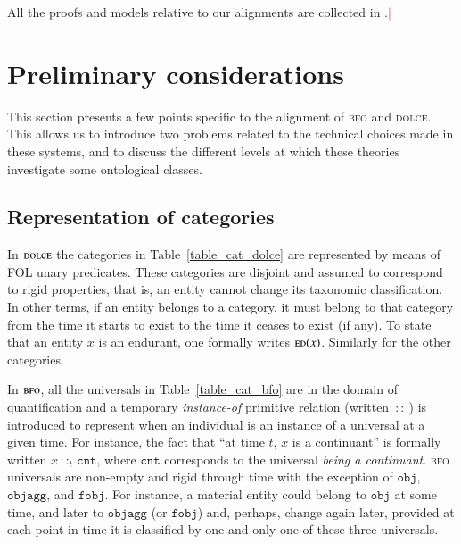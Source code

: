 \documentclass[ao]{iosart2x}
\newcommand{\nb}[1]{\textcolor{red}{$|$}\marginpar{\hspace*{-0cm}\parbox{20mm}{\scriptsize\raggedright\textcolor{red}{#1}}}}
\newcommand{\cn}[1]{\mathtt{#1}}
\newcommand{\dolce}{{\textsc{dolce}}}
\newcommand{\bfo}{{\textsc{bfo}}}
\newcommand {\EDdcat} {\textsc{ed}}
\newcommand{\cntbcat}{\cn{cnt}}
\newcommand{\objbcat}{\cn{obj}}
\newcommand{\fobjbcat}{\cn{fobj}}
\newcommand{\objaggbcat}{\cn{objagg}}
\newcommand{\bfoiof}[1]{{\,::_{#1\:\!}}}
\begin{document}


All the proofs and models relative to our alignments are collected in \citep{??}.\nb{CM: mettiamo il del d2.4 in cui manca qualcosa o un rapporto?}

\section{Preliminary considerations}\label{sect_prelim_considerations}
This section presents a few points specific to the alignment of {\bfo} and {\dolce}. This allows us to introduce two problems related to the technical choices made in these systems, and to discuss the different levels at which these theories investigate some ontological classes. 



\subsection{Representation of categories}\label{sect_problem_univ}

In  {$\dolce$} the categories in  Table~\ref{table_cat_dolce} are represented by means of FOL unary predicates. These categories are disjoint and assumed to correspond to rigid properties, that is, an entity cannot change its taxonomic classification. In other terms, if an entity belongs to a category, it must belong to that category from the time it starts to exist to the time it ceases to exist (if any). To state that an entity $x$ is an endurant, one formally writes $\EDdcat(x)$. Similarly for the other categories.

In {$\bfo$}, all the universals in Table~\ref{table_cat_bfo} are in the domain of quantification and a temporary \emph{instance-of} primitive relation (written $\bfoiof{}$) is introduced to represent when %
an individual is an instance of a universal at a given time. For instance, the fact that ``at time $t$, $x$ is a continuant'' is formally written $x \bfoiof{t} \cntbcat$, where $\cntbcat$ corresponds to the universal \emph{being a continuant}.
{\bfo} universals are non-empty and rigid through time %
with the exception of $\objbcat$, $\objaggbcat$, and $\fobjbcat$. For instance, a material entity could belong to $\objbcat$ at some time, and later to $\objaggbcat$ (or $\fobjbcat$) and, perhaps, change again later, provided at each point in time it is classified by one and only one of these three universals.
\end{document}
